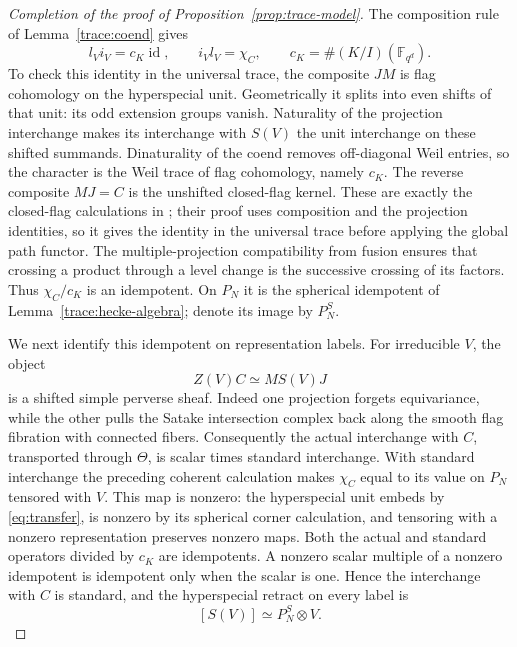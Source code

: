 \documentclass[11pt]{article}
\numberwithin{equation}{section}
\theoremstyle{definition}
\theoremstyle{remark}
\newcommand{\F}{\mathbb F}
\newcommand{\id}{\operatorname{id}}
\begin{document}
\begin{proof}[Completion of the proof of Proposition~\ref{prop:trace-model}]
The composition rule of Lemma~\ref{trace:coend} gives
\begin{equation}\label{eq:transfer}
 l_Vi_V=c_K\id,\qquad
 i_Vl_V=\chi_C,\qquad
 c_K=\#(K/I)(\F_{q^d}).
\end{equation}
To check this identity in the universal trace, the composite $JM$ is
flag cohomology on the hyperspecial unit.  Geometrically it splits
into even shifts of that unit: its odd extension groups vanish.
Naturality of the projection interchange makes its interchange with
$S(V)$ the unit interchange on these shifted summands.  Dinaturality
of the coend removes off-diagonal Weil entries, so the character is
the Weil trace of flag cohomology, namely $c_K$.  The reverse composite
$MJ=C$ is the unshifted closed-flag kernel.  These are exactly the
closed-flag calculations in
\cite[Proposition~2.6, ``Hecke action and transfer'']{Parent}; their proof
uses composition and the projection identities, so it gives the
identity in the universal trace before applying the global path
functor.  The multiple-projection compatibility from fusion ensures
that crossing a product through a level change is the successive
crossing of its factors.  Thus $\chi_C/c_K$ is an idempotent.  On
$P_N$ it is the spherical idempotent of
Lemma~\ref{trace:hecke-algebra}; denote its image by $P_N^S$.

We next identify this idempotent on representation labels.  For
irreducible $V$, the object
\[
 Z(V)C\simeq MS(V)J
\]
is a shifted simple perverse sheaf.  Indeed one projection forgets
equivariance, while the other pulls the Satake intersection complex
back along the smooth flag fibration with connected fibers.
Consequently the actual interchange with $C$, transported through
$\Theta$, is scalar times standard interchange.  With standard
interchange the preceding coherent calculation makes $\chi_C$ equal
to its value on $P_N$ tensored with $V$.  This map is nonzero: the
hyperspecial unit embeds by \eqref{eq:transfer}, is nonzero by its
spherical corner calculation, and tensoring with a nonzero
representation preserves nonzero maps.  Both the actual and standard
operators divided by $c_K$ are idempotents.  A nonzero scalar multiple
of a nonzero idempotent is idempotent only when the scalar is one.
Hence the interchange with $C$ is standard, and the hyperspecial
retract on every label is
\begin{equation}\label{trace:spherical-retract}
 [S(V)]\simeq P_N^S\otimes V.
\end{equation}


\end{proof}
\end{document}
